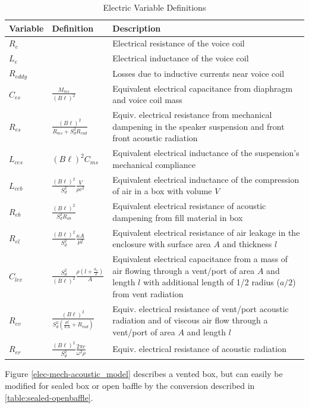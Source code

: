 \documentclass[10pt,letterpaper]{book}
\begin{document}
\begin{table}
\centering
\renewcommand{\arraystretch}{1.5}
\begin{tabularx}{\textwidth}{@{} ll X @{}}
\toprule
Variable & Definition & Description \\
\midrule
$R_e$ & & Electrical resistance of the voice coil\\
$L_e$ & & Electrical inductance of the voice coil\\
$R_{eddy}$ & & Losses due to inductive currents near voice coil\\
$C_{es}$ & $\frac{M_{ms}}{(B\ell)^2}$ & Equivalent electrical capacitance from diaphragm and voice coil mass\\
$R_{es}$ & $\frac{(B\ell)^2}{R_{ms}+S_d^2R_{rad}}$ & Equiv. electrical resistance from mechanical dampening in the speaker suspension and front front acoustic radiation\\
$L_{ces}$ & $(B\ell)^2C_{ms}$ & Equivalent electrical inductance of the suspension's mechanical compliance\\
$L_{ceb}$ & $\frac{(B\ell)^2}{S_d^2} \frac{V}{\rho c^2}$ & Equivalent electrical inductance of the compression of air in a box with volume $V$\\
$R_{eb}$ & $\frac{(B\ell)^2}{S_d^2 R_{ab}}$ & Equivalent electrical resistance of acoustic dampening from fill material in box\\
$R_{el}$ & $\frac{(B\ell)^2}{S_d^2 } \frac{\kappa A}{\mu l}$ & Equivalent electrical resistance of air leakage in the enclosure with surface area $A$ and thickness $l$\\
$C_{lev}$ & $\frac{S_d^2}{(B\ell)^2}\frac{\rho \left(l+\frac{a_v}{2}\right)}{A}$ & Equivalent electrical capacitance from a mass of air flowing through a vent/port of area $A$ and length $l$ with additional length of 1/2 radius ($a/2$) from vent radiation\\
$R_{ev}$ & $\frac{(B\ell)^2}{S_d^2\left( \frac{\mu l}{\kappa A}+R_{rad}\right)}$ & Equiv. electrical resistance of vent/port acoustic radiation and of viscous air flow through a vent/port of area $A$ and length $l$\\
$R_{er}$ & $\frac{(B\ell)^2}{S_d^2}\frac{2\pi c}{\omega^2 \rho}$& Equiv. electrical resistance of acoustic radiation\\
\bottomrule
\end{tabularx}
\caption{Electric Variable Definitions}\label{table:variables}
\end{table}

Figure \ref{elec-mech-acoustic_model} describes a vented box, but can easily be modified for sealed box or open baffle by the conversion described in \ref{table:sealed-openbaffle}.
\end{document}
